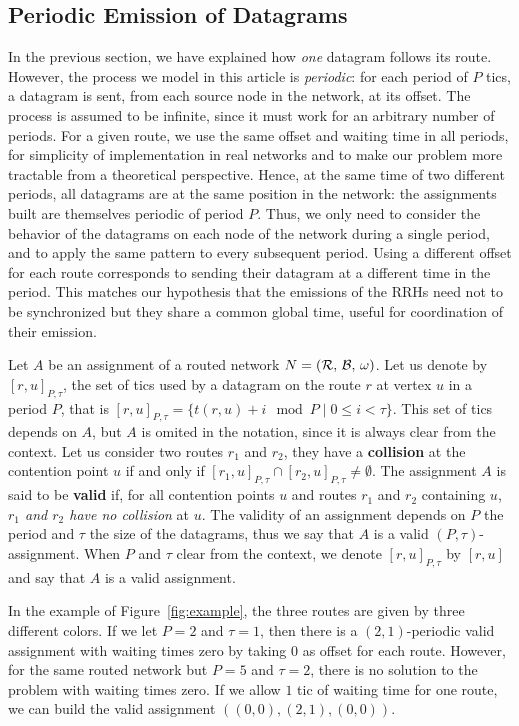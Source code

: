 \documentclass[a4paper,10pt]{article}
\begin{document}
 	\subsection{Periodic Emission of Datagrams}

	In the previous section, we have explained how \emph{one} datagram follows its route.
	However, the process we model in this article is \emph{periodic}: for each period of $P$ tics, a datagram is sent, from each source node in the network, at its offset. The process is assumed to be infinite, since it must work for an arbitrary number of periods. For a given route, we use the same offset and waiting time in all periods, for simplicity of implementation in real networks and to make our problem more tractable from a theoretical perspective. Hence, at the same time of two different periods, all datagrams are at the same position in the network: the assignments built are themselves periodic of period $P$. Thus, we only need to consider the behavior of the datagrams on each node of the network during a single period, and to apply the same pattern to every subsequent period. 
 	Using a different offset for each route corresponds to sending their datagram at a different time in the period. This matches our hypothesis that the emissions of the RRHs need not to be synchronized but they share a common global time, useful for coordination of their emission.

 	Let $A$ be an assignment of a routed network $N = (\cal{R},\,\cal{B},\,\omega)$.
    Let us denote by $[r,u]_{P,\tau}$, the set of tics used by a datagram on the route $r$ at vertex $u$ in a period $P$, that is $[r,u]_{P,\tau} = \{t(r,u) + i \mod P \mid 0 \leq i < \tau \}$. This set of tics depends on $A$,
    but $A$ is omited in the notation, since it is always clear from the context.
    Let us consider two routes $r_1$ and $r_2$, they have a {\bf collision} at the contention point $u$ if and only if $[r_1,u]_{P,\tau} \cap [r_2,u]_{P,\tau} \neq \emptyset$.
    The assignment $A$ is said to be \textbf{valid} if, for all contention points $u$ and routes $r_1$ and $r_2$ containing $u$, \emph{$r_1$ and $r_2$ have no collision} at $u$. 
    The validity of an assignment depends on $P$ the period and $\tau$ the size of the datagrams,
    thus we say that $A$ is a valid $(P,\tau)$-assignment. When $P$ and $\tau$ clear from the context, 
    we denote $[r,u]_{P,\tau}$ by $[r,u]$ and say that $A$ is a valid assignment. 

     In the example of Figure~\ref{fig:example}, the three routes are given by three different colors. If we let $P = 2$ and $\tau = 1$, then there is a $(2,1)$-periodic valid assignment with waiting times zero by taking $0$ as offset for each route. However, for the same routed network but $P=5$ and $\tau = 2$, there is no solution to the problem with waiting times zero. If we allow $1$ tic of waiting time for one route, we can build the valid assignment $((0,0),(2,1),(0,0))$.
\end{document}

